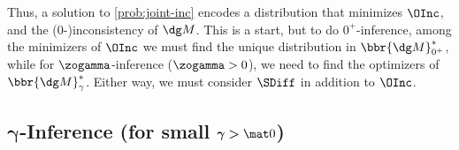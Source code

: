 Thus, a solution to \eqref{prob:joint-inc}
encodes a distribution that minimizes $\OInc$, and
the (0-)inconsistency
of $\dg M$.
This is a start, but to do 
$0^+$-inference,
among the minimizers of $\OInc$
we must find the unique distribution in $\bbr{\dg M}^*_{0^+}$, 
while for $\zogamma$-inference ($\zogamma > 0$), we need to find the optimizers of
$\bbr{\dg M}^*_\gamma$.
Either way, we must consider 
$\SDiff$
in addition to $\OInc$. 

\subsection{%
    \texorpdfstring{$\boldsymbol\gamma$}{gamma}-Inference
    (for small \texorpdfstring{$\boldsymbol\gamma\boldsymbol>\mat0$}{gamma})%
} \label{sec:small-gamma}

